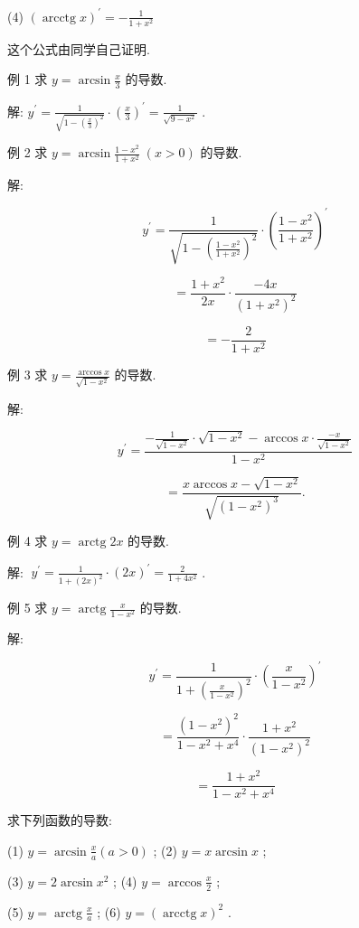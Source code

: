 \documentclass[lang=cn,newtx,10pt,scheme=chinese]{elegantbook}
\begin{document}
(4) \({\left( \operatorname{arcctg}x\right) }^{\prime } = - \frac{1}{1 + {x}^{2}}\)

这个公式由同学自己证明.

例 1 求 \(y = \arcsin \frac{x}{3}\) 的导数.

解: \({y}^{\prime } = \frac{1}{\sqrt{1 - {\left( \frac{x}{3}\right) }^{2}}} \cdot {\left( \frac{x}{3}\right) }^{\prime } = \frac{1}{\sqrt{9 - {x}^{2}}}\) .

例 2 求 \(y = \arcsin \frac{1 - {x}^{2}}{1 + {x}^{2}}\;\left( {x > 0}\right)\) 的导数.

解:

\[
{y}^{\prime } = \frac{1}{\sqrt{1 - {\left( \frac{1 - {x}^{2}}{1 + {x}^{2}}\right) }^{2}}} \cdot {\left( \frac{1 - {x}^{2}}{1 + {x}^{2}}\right) }^{\prime }
\]

\[
= \frac{1 + {x}^{2}}{2x} \cdot \frac{-{4x}}{{\left( 1 + {x}^{2}\right) }^{2}}
\]

\[
= - \frac{2}{1 + {x}^{2}}
\]

例 3 求 \(y = \frac{\arccos x}{\sqrt{1 - {x}^{2}}}\) 的导数.

解:

\[
{y}^{\prime } = \frac{-\frac{1}{\sqrt{1 - {x}^{2}}} \cdot \sqrt{1 - {x}^{2}} - \arccos x \cdot \frac{-x}{\sqrt{1 - {x}^{2}}}}{1 - {x}^{2}}
\]

\[
= \frac{x\arccos x - \sqrt{1 - {x}^{2}}}{\sqrt{{\left( 1 - {x}^{2}\right) }^{3}}}.
\]

例 4 求 \(y = \operatorname{arctg}{2x}\) 的导数.

解: \(\;{y}^{\prime } = \frac{1}{1 + {\left( 2x\right) }^{2}} \cdot {\left( 2x\right) }^{\prime } = \frac{2}{1 + 4{x}^{2}}\) .

例 5 求 \(y = \operatorname{arctg}\frac{x}{1 - {x}^{2}}\) 的导数.

解:

\[
{y}^{\prime } = \frac{1}{1 + {\left( \frac{x}{1 - {x}^{2}}\right) }^{2}} \cdot {\left( \frac{x}{1 - {x}^{2}}\right) }^{\prime }
\]

\[
= \frac{{\left( 1 - {x}^{2}\right) }^{2}}{1 - {x}^{2} + {x}^{4}} \cdot \frac{1 + {x}^{2}}{{\left( 1 - {x}^{2}\right) }^{2}}
\]

\[
= \frac{1 + {x}^{2}}{1 - {x}^{2} + {x}^{4}}
\]

\begin{problemset}[练习]

\item 求下列函数的导数:

(1) \(y = \arcsin \frac{x}{a}\left( {a > 0}\right)\) ; (2) \(y = x\arcsin x\) ;

(3) \(y = 2\arcsin {x}^{2}\) ; (4) \(y = \arccos \frac{x}{2}\) ;

(5) \(y = \operatorname{arctg}\frac{x}{a}\) ; (6) \(y = {\left( \operatorname{arcctg}x\right) }^{2}\) .

\end{problemset}
\end{document}
